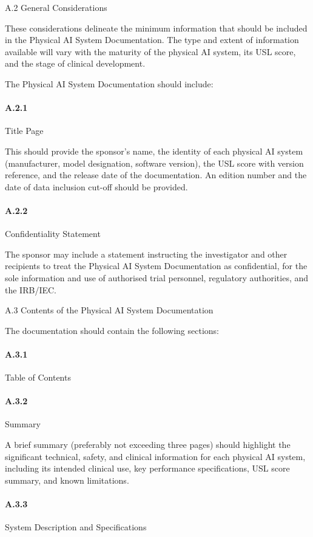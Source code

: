 \documentclass[11pt]{article}
\begin{document}
A.2 General Considerations

These considerations delineate the minimum information that should be included in the Physical AI System Documentation. The type and extent of information available will vary with the maturity of the physical AI system, its USL score, and the stage of clinical development.

The Physical AI System Documentation should include:

\paragraph{A.2.1} Title Page

This should provide the sponsor's name, the identity of each physical AI system (manufacturer, model designation, software version), the USL score with version reference, and the release date of the documentation. An edition number and the date of data inclusion cut-off should be provided.

\paragraph{A.2.2} Confidentiality Statement

The sponsor may include a statement instructing the investigator and other recipients to treat the Physical AI System Documentation as confidential, for the sole information and use of authorised trial personnel, regulatory authorities, and the IRB/IEC.

A.3 Contents of the Physical AI System Documentation

The documentation should contain the following sections:

\paragraph{A.3.1} Table of Contents

\paragraph{A.3.2} Summary

A brief summary (preferably not exceeding three pages) should highlight the significant technical, safety, and clinical information for each physical AI system, including its intended clinical use, key performance specifications, USL score summary, and known limitations.

\paragraph{A.3.3} System Description and Specifications
\end{document}
